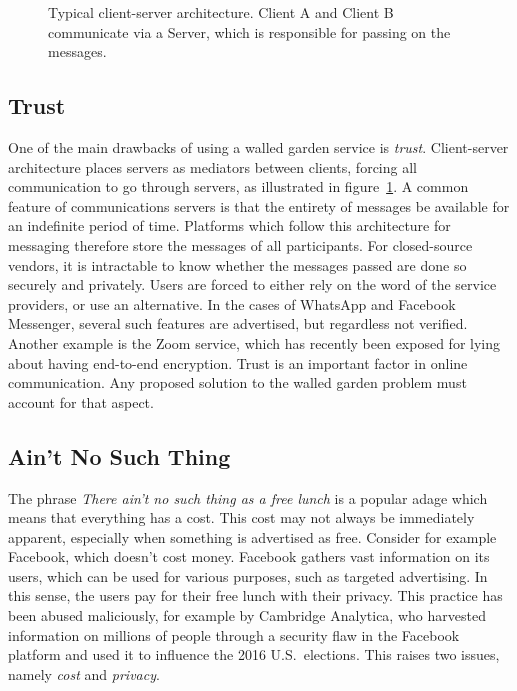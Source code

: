 \begin{figure}
	\centering
	\resizebox{!}{!}{}
	\caption{
		Typical client-server architecture.
		Client A and Client B communicate via a Server, which is responsible for passing on the messages.
	}\label{fig:client_server}
\end{figure}

\subsection{Trust}\label{sec:Trust}
One of the main drawbacks of using a walled garden service is \textit{trust}.
Client-server architecture places servers as mediators between clients, forcing all communication to go through servers, as illustrated in figure~\ref{fig:client_server}.
A common feature of communications servers is that the entirety of messages be available for an indefinite period of time.
Platforms which follow this architecture for messaging therefore store the messages of all participants.
For closed-source vendors, it is intractable to know whether the messages passed are done so securely and privately.
Users are forced to either rely on the word of the service providers, or use an alternative.
In the cases of WhatsApp and Facebook Messenger, several such features are advertised, but regardless not verified\cite{twitter_comms_protocol_comparison}.
Another example is the Zoom service, which has recently been exposed for lying about having end-to-end encryption\cite{zoom_e2ee_or_not}.
Trust is an important factor in online communication.
Any proposed solution to the walled garden problem must account for that aspect.

\subsection{Ain't No Such Thing}
The phrase \textit{There ain't no such thing as a free lunch} is a popular adage which means that everything has a cost.
This cost may not always be immediately apparent, especially when something is advertised as free.
Consider for example Facebook, which doesn't cost money.
Facebook gathers vast information on its users, which can be used for various purposes, such as targeted advertising.
In this sense, the users pay for their free lunch with their privacy.
This practice has been abused maliciously, for example by Cambridge Analytica,
who harvested information on millions of people through a security flaw in the Facebook platform and used it to influence the 2016 U.S.~elections\cite{cadwalladr2018revealed, cadwalladr2018cambridge, isaak2018user, berghel2018malice}.
This raises two issues, namely \textit{cost} and \textit{privacy}.

